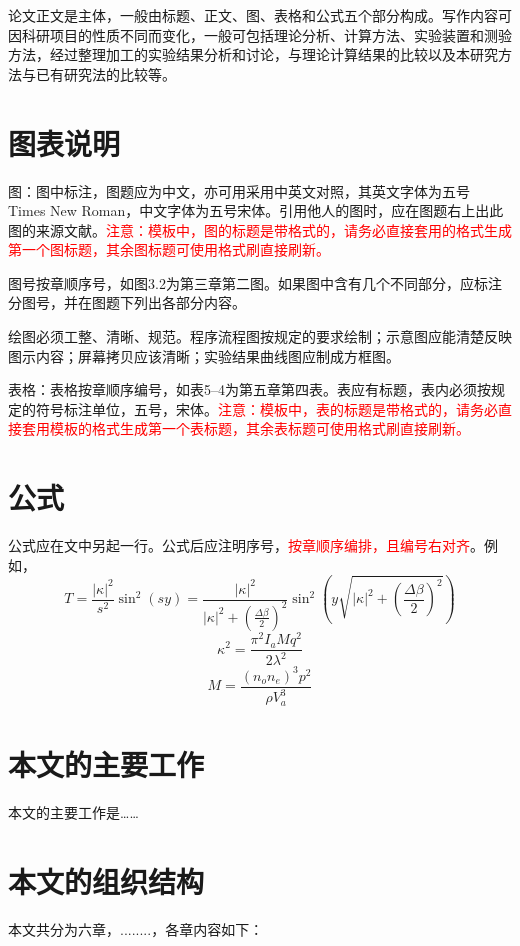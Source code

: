 \documentclass[12pt]{zjutbook}
\begin{document}
论文正文是主体，一般由标题、正文、图、表格和公式五个部分构成。写作内容可因科研项目的性质不同而变化，一般可包括理论分析、计算方法、实验装置和测验方法，经过整理加工的实验结果分析和讨论，与理论计算结果的比较以及本研究方法与已有研究法的比较等。

\section{图表说明}
图：图中标注，图题应为中文，亦可用采用中英文对照，其英文字体为五号 Times New Roman，中文字体为五号宋体。引用他人的图时，应在图题右上出此图的来源文献。\textcolor{red}{注意：模板中，图的标题是带格式的，请务必直接套用的格式生成第一个图标题，其余图标题可使用格式刷直接刷新。}

图号按章顺序号，如图3.2为第三章第二图。如果图中含有几个不同部分，应标注分图号，并在图题下列出各部分内容。

绘图必须工整、清晰、规范。程序流程图按规定的要求绘制；示意图应能清楚反映图示内容；屏幕拷贝应该清晰；实验结果曲线图应制成方框图。

表格：表格按章顺序编号，如表5--4为第五章第四表。表应有标题，表内必须按规定的符号标注单位，五号，宋体。\textcolor{red}{注意：模板中，表的标题是带格式的，请务必直接套用模板的格式生成第一个表标题，其余表标题可使用格式刷直接刷新。}

\section{公式}
公式应在文中另起一行。公式后应注明序号，\textcolor{red}{按章顺序编排，且编号右对齐}。例如，
\begin{equation}
  T=\frac{\left|\kappa\right|^2}{s^2}\sin^2(sy)=\frac{\left|\kappa\right|^2}{\left|\kappa\right|^2+(\frac{\Delta\beta}{2})^2}\sin^2\left(y\sqrt{\left|\kappa\right|^2+(\frac{\Delta\beta}{2})^2}\right)
\end{equation}
\begin{equation}
  \kappa^2=\frac{\pi^2I_aMq^2}{2\lambda^2}
\end{equation}
\begin{equation}
  M=\frac{(n_on_e)^3p^2}{\rho V_a^3}
\end{equation}

\section{本文的主要工作}
本文的主要工作是……

\section{本文的组织结构}
本文共分为六章，........，各章内容如下：
\end{document}
